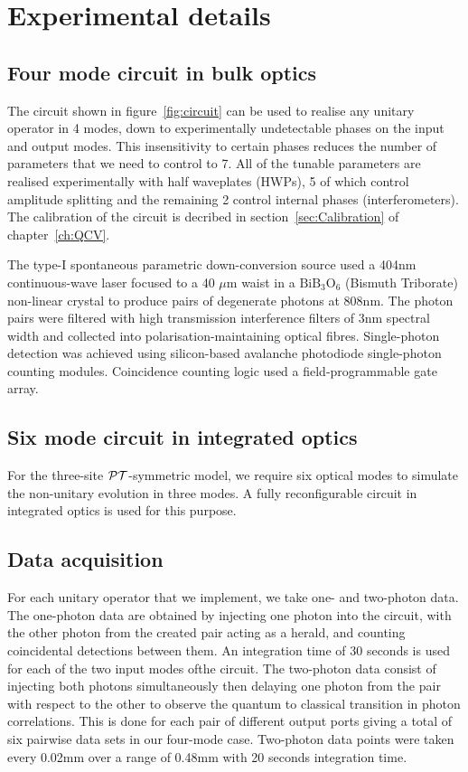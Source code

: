 \section{Experimental details}
\label{sec:SimulationExperiment}
\subsection{Four mode circuit in bulk optics}
The circuit shown in figure~\ref{fig:circuit} can be used to realise any
unitary operator in 4 modes, down to experimentally undetectable phases on the
input and output modes. This insensitivity to certain phases reduces the number
of parameters that we need to control to 7. All of the tunable parameters are
realised experimentally with half waveplates (HWPs), 5 of which control
amplitude splitting and the remaining 2 control internal phases
(interferometers). The calibration of the circuit is decribed in
section~\ref{sec:Calibration} of chapter~\ref{ch:QCV}.

The type-I spontaneous parametric down-conversion source used a 404nm
continuous-wave laser focused to a 40 \(\mu\)m waist in a \(\text{BiB}_3
\text{O}_6\) (Bismuth Triborate) non-linear crystal to produce pairs of
degenerate photons at 808nm. The photon pairs were filtered with high
transmission interference filters of 3nm spectral width and collected into
polarisation-maintaining optical fibres. Single-photon detection was achieved
using silicon-based avalanche photodiode single-photon counting modules.
Coincidence counting logic used a field-programmable gate array.

\subsection{Six mode circuit in integrated optics}
For the three-site \(\mathcal{PT}\)-symmetric model, we require six optical modes to
simulate the non-unitary evolution in three modes. A fully reconfigurable
circuit in integrated optics is used for this purpose.

\subsection{Data acquisition}
For each unitary operator that we implement, we take one- and two-photon data.
The one-photon data are obtained by injecting one photon into the circuit, with
the other photon from the created pair acting as a herald, and counting
coincidental detections between them. An integration time of 30 seconds is used
for each of the two input modes ofthe circuit.
The two-photon data consist of injecting both photons simultaneously then
delaying one photon from the pair with respect to the other to observe the
quantum to classical transition in photon correlations. This is done for each
pair of different output ports giving a total of six pairwise data sets in our
four-mode case. Two-photon data points were taken every 0.02mm over a range of
0.48mm with 20 seconds integration time.

